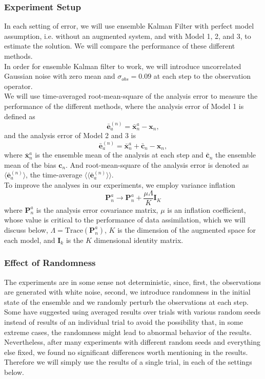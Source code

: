 \documentclass[twocolumn]{article}
\begin{document}
\subsubsection{Experiment Setup}
In each setting of error, we will use ensemble Kalman Filter with perfect model assumption, i.e. without an augmented system, and with Model 1, 2, and 3, to estimate the solution. We will compare the performance of these different methods.\\
In order for ensemble Kalman filter to work, we will introduce uncorrelated Gaussian noise with zero mean and $\sigma_{obs}=0.09$ at each step to the observation operator.\\
We will use time-averaged root-mean-square of the analysis error to measure the performance of the different methods, where the analysis error of Model 1 is defined as
\begin{equation}
\bar{\pmb{e}}^{(n)}_a=\bar{\pmb{x}}_n^a-\pmb{x}_n,
\end{equation}
and the analysis error of Model 2 and 3 is
\begin{equation}
\bar{\pmb{e}}^{(n)}_a=\bar{\pmb{x}}_n^a+\bar{\pmb{c}}_n-\pmb{x}_n,
\end{equation}
where $\bar{\pmb{x}}_n^a$ is the ensemble mean of the analysis at each step and $\bar{\pmb{c}}_n$ the ensemble mean of the bias $\pmb{c}_n$. And root-mean-square of the analysis error is denoted as $\langle\bar{\pmb{e}}_a^{(n)}\rangle$, the time-average $\langle\langle\bar{\pmb{e}}_a^{(n)}\rangle\rangle$.\\
To improve the analyses in our experiments, we employ variance inflation
\begin{equation} \label{inflation}
\pmb{P}_n^a\rightarrow \pmb{P}_n^a+\dfrac{\mu\Lambda}{K}\pmb{I}_K
\end{equation}
where $\pmb{P}_n^a$ is the analysis error covariance matrix, $\mu$ is an inflation coefficient, whose value is critical to the performance of data assimilation, which we will discuss below, $\Lambda =\mathrm{Trace}(\pmb{P}_n^a)$, $K$ is the dimension of the augmented space for each model, and $\pmb{I}_k$ is the $K$ dimensional identity matrix. 
\subsubsection{Effect of Randomness}
The experiments are in some sense not deterministic, since, first, the observations are generated with white noise, second, we introduce randomness in the initial state of the ensemble and we randomly perturb the observations at each step. Some have suggested using averaged results over trials with various random seeds instead of results of an individual trial to avoid the possibility that, in some extreme cases, the randomness might lead to abnormal behavior of the results. Nevertheless, after many experiments with different random seeds and everything else fixed, we found no significant differences worth mentioning in the results. Therefore we will simply use the results of a single trial, in each of the settings below.
\end{document}
